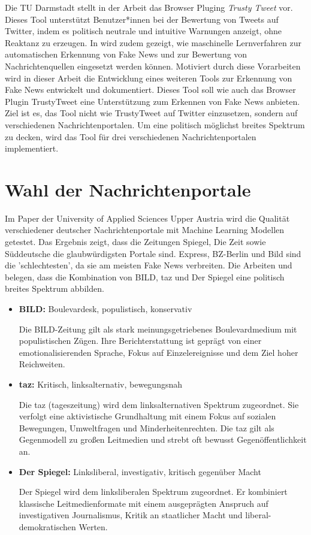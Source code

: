 Die TU Darmstadt stellt in der Arbeit \cite{Hartwig2021} das Browser Pluging \textit{Trusty Tweet} vor. Dieses Tool unterstützt Benutzer*innen bei der Bewertung von
Tweets auf Twitter, indem es politisch neutrale und intuitive Warnungen anzeigt, ohne Reaktanz zu erzeugen. 
In \cite{Simone2022} wird zudem gezeigt, wie maschinelle Lernverfahren zur automatischen Erkennung von Fake News und zur Bewertung von Nachrichtenquellen eingesetzt werden können.
Motiviert durch diese Vorarbeiten wird in dieser Arbeit die Entwicklung eines weiteren Tools zur Erkennung von Fake News entwickelt und dokumentiert.
Dieses Tool soll wie auch das Browser Plugin TrustyTweet eine Unterstützung zum Erkennen von Fake News anbieten.
Ziel ist es, das Tool nicht wie TrustyTweet auf Twitter einzusetzen, sondern auf verschiedenen Nachrichtenportalen.
Um eine politisch möglichst breites Spektrum zu decken, wird das Tool für drei verschiedenen Nachrichtenportalen implementiert.

\section{Wahl der Nachrichtenportale}
\label{sec:wahl_nachrichtenportale}

Im Paper der University of Applied Sciences Upper Austria \cite{Simone2022} wird die Qualität verschiedener deutscher Nachrichtenportale mit 
Machine Learning Modellen getestet. 
Das Ergebnis zeigt, dass die Zeitungen Spiegel, Die Zeit sowie Süddeutsche die glaubwürdigsten Portale sind. Express, BZ-Berlin und Bild sind die 'schlechtesten', da sie
am meisten Fake News verbreiten.
Die Arbeiten \cite{henke2024nachrichten, Lieb2023} und \cite{Osing2022} belegen, dass die Kombination von BILD, taz und Der Spiegel eine politisch 
breites Spektrum abbilden.

\begin{itemize}
    \item \textbf{BILD:} Boulevardesk, populistisch, konservativ
   
    Die BILD-Zeitung gilt als stark meinungsgetriebenes Boulevardmedium mit populistischen Zügen. Ihre Berichterstattung ist geprägt von einer emotionalisierenden Sprache, 
    Fokus auf Einzelereignisse und dem Ziel hoher Reichweiten.

    \item \textbf{taz:} Kritisch, linksalternativ, bewegungsnah
    
    Die taz (tageszeitung) wird dem linksalternativen Spektrum zugeordnet. Sie verfolgt eine aktivistische Grundhaltung mit einem Fokus auf 
    sozialen Bewegungen, Umweltfragen und Minderheitenrechten. 
    Die taz gilt als Gegenmodell zu großen Leitmedien und strebt oft bewusst Gegenöffentlichkeit an.

    \item \textbf{Der Spiegel:} Linksliberal, investigativ, kritisch gegenüber Macht
    
    Der Spiegel wird dem linksliberalen Spektrum zugeordnet. Er kombiniert klassische Leitmedienformate mit einem ausgeprägten Anspruch auf 
    investigativen Journalismus, Kritik an staatlicher Macht und liberal-demokratischen Werten.
\end{itemize}

